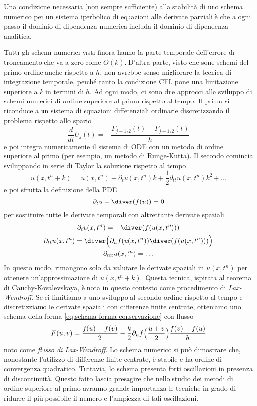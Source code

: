 \begin{prop}
Una condizione necessaria (non sempre sufficiente) alla stabilità
di uno schema numerico per un sistema iperbolico di equazioni alle derivate parziali
è che a ogni passo il dominio di dipendenza numerica
includa il dominio di dipendenza analitica.
\end{prop}

\noindent Tutti gli schemi numerici visti finora hanno la parte temporale
dell'errore di troncamento che va a zero come $O(k)$. D'altra parte, visto
che sono schemi del primo ordine anche rispetto a $h$, non avrebbe senso
migliorare la tecnica di integrazione temporale, perché tanto
la condizione CFL pone una limitazione superiore a $k$ in termini di $h$.
Ad ogni modo, ci sono due approcci allo sviluppo di schemi numerici
di ordine superiore al primo rispetto al tempo.
Il primo si riconduce a un sistema di equazioni differenziali
ordinarie discretizzando il problema rispetto allo spazio
\[
\frac{d}{dt} U_j(t) = - \frac{F_{j+1/2}(t) - F_{j-1/2}(t)}{h}
\]
e poi integra numericamente il sistema di ODE con un metodo di ordine superiore
al primo (per esempio, un metodo di Runge-Kutta).
Il secondo comincia sviluppando in serie di Taylor la soluzione rispetto al tempo
\[
u(x,t^{n}+k)
= u(x,t^{n})
+ \partial_t u(x,t^n) k
+ \frac{1}{2} \partial_{tt} u(x,t^n) k^2
+ \dots
\]
e poi sfrutta la definizione della PDE
\[
\partial_t u + \diver(f(u)) = 0
\]
per sostituire tutte le derivate temporali con altrettante derivate spaziali
\begin{gather*}
\partial_t u(x,t^n) = -\diver(f(u(x,t^n))) \\
\partial_{tt} u(x,t^n) = \diver\Bigl( \partial_u f(u(x,t^n)) \diver(f(u(x,t^n))) \Bigr) \\
\partial_{ttt} u(x,t^n) = \dots
\end{gather*}
In questo modo, rimangono solo da valutare le derivate spaziali in
$u(x,t^n)$ per ottenere un'approssimazione di $u(x,t^{n}+k)$.
Questa tecnica, ispirata al teorema di Cauchy-Kovalevskaya, è nota in questo
contesto come procedimento di \emph{Lax-Wendroff}.
Se ci limitiamo a uno sviluppo al secondo ordine rispetto al tempo e discretizziamo
le derivate spaziali con differenze finite centrate, otteniamo uno schema
della forma \eqref{eq:schema-forma-conservazione} con flusso
\[
F(u,v) = \frac{f(u)+f(v)}{2}
       - \frac{k}{2} \partial_u f \Bigl( \frac{u+v}{2} \Bigr) \frac{f(v)-f(u)}{h}
\]
noto come \emph{flusso di Lax-Wendroff}. Lo schema numerico si può dimostrare
che, nonostante l'utilizzo di differenze finite centrate, è stabile
e ha ordine di convergenza quadratico. Tuttavia, lo schema presenta
forti oscillazioni in presenza di discontinuità.
Questo fatto lascia presagire che nello studio dei metodi di ordine
superiore al primo avranno grande importanza le tecniche in grado
di ridurre il più possibile il numero e l'ampiezza di tali oscillazioni.

